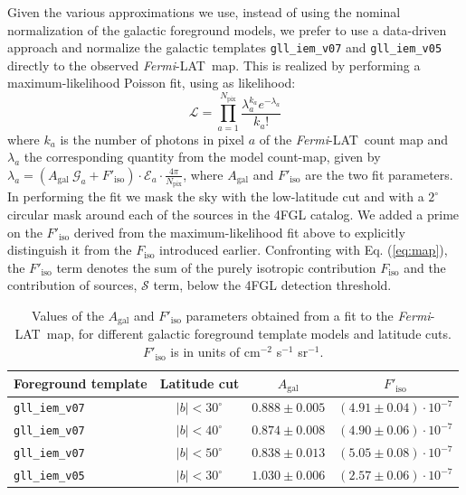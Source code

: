 \documentclass[a4paper,11pt]{article}
\newcommand{\fermi}{\textsl{Fermi}-LAT\ }
\begin{document}
Given the various approximations we use, instead of using the nominal normalization of the galactic foreground models, we prefer to use a data-driven approach and normalize 
the galactic templates \verb|gll_iem_v07| and \verb|gll_iem_v05| directly to the observed \fermi map. This is realized by performing a maximum-likelihood Poisson fit, using as likelihood:
%
\begin{equation}
\mathcal{L}=\prod_{a=1}^{N_\textrm{pix}} \frac{\lambda_{a}^{k_{a}} e^{-\lambda_{a}}}{k_{a} !}
\end{equation}
%
where $k_a$ is the number of photons in pixel $a$ of the \fermi count map and $\lambda_a$ the corresponding quantity from the model count-map, given by $\lambda_a = (A_\textrm{gal}\ \mathcal{G}_a + F'_\textrm{iso}) \cdot \mathcal{E}_a \cdot \frac{4\pi}{N_\textrm{pix}} $, where $A_\textrm{gal}$ and $F'_\textrm{iso}$ are the two fit parameters. In performing the fit we mask the sky with the low-latitude cut and with a $2^\circ$ circular mask around each of the sources in the 4FGL catalog. 
We added a prime on the $F'_\textrm{iso}$ derived from the maximum-likelihood fit above to explicitly distinguish it from the $F_\textrm{iso}$ introduced earlier.
Confronting with Eq. (\ref{eq:map}), the $F'_\textrm{iso}$ term denotes the sum of the purely isotropic contribution $F_\textrm{iso}$  and the contribution of sources, $\mathcal{S}$ term, below the 4FGL detection threshold.


\begin{table}[t]
\centering
\begin{tabular}{|l|c|c|c|}
\hline
Foreground template & Latitude cut & $A_\textrm{gal}$ & $F'_\textrm{iso}$ \\
\hline
\verb|gll_iem_v07| & $|b|<30^\circ$ & $0.888 \pm 0.005$ & $(4.91  \pm 0.04 ) \cdot 10^{-7}$ \\
\verb|gll_iem_v07| & $|b|<40^\circ$ & $0.874 \pm 0.008$ & $(4.90  \pm 0.06 ) \cdot 10^{-7}$ \\
\verb|gll_iem_v07| & $|b|<50^\circ$ & $0.838 \pm 0.013$ & $(5.05  \pm 0.08 ) \cdot 10^{-7}$ \\
\hline
\verb|gll_iem_v05| & $|b|<30^\circ$ & $1.030 \pm 0.006$ & $(2.57  \pm 0.06 ) \cdot 10^{-7}$ \\
\hline 
\end{tabular}
\caption{Values of the $A_\textrm{gal}$ and $F'_\textrm{iso}$ parameters obtained from a fit to the \fermi map, for different galactic foreground template models and latitude cuts. $F'_\textrm{iso}$ is in units of cm$^{-2}$ s$^{-1}$ sr$^{-1}$.}
\label{tab:fore-parameters}
\end{table}
\end{document}
